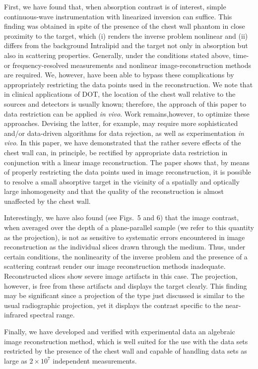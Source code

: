 First, we have found that, when absorption contrast is of interest, simple continuous-wave instrumentation with linearized inversion can suffice. This finding was obtained in spite of the presence of the chest wall phantom in close proximity to the target, which (i) renders the inverse problem nonlinear and (ii) differs from the background Intralipid and the target not only in absorption but also in scattering properties.  Generally, under the conditions stated above,
time- or frequency-resolved measurements and nonlinear image-reconstruction methods are required. We, however, have been able to bypass these complications by appropriately restricting the data points used in the reconstruction. We note that in clinical applications of DOT, the location of the chest wall relative to the sources and detectors is usually known;  therefore, the approach of this paper to data restriction can be applied {\em in vivo}. Work remains,however, to optimize these approaches. Devising the latter, for example, may require more sophisticated and/or data-driven algorithms for data rejection, as well as  experimentation {\em in vivo}. In this paper, we have demonstrated that the rather severe effects of the chest wall can, in principle, be rectified by appropriate data restriction in conjunction with a linear image reconstruction. The paper shows that, by means of properly restricting the data points used in image reconstruction, it is possible to resolve a small absorptive target in the vicinity of a spatially and optically large inhomogeneity
and that the quality of the reconstruction is almost unaffected by the chest wall.

Interestingly, we have also found (see Figs.~5 and 6) that the image contrast, when averaged over the depth of a plane-parallel sample (we refer to
this quantity as the projection), is not as sensitive to systematic errors encountered in image reconstruction as the individual slices drawn through the medium. Thus, under certain conditions, the nonlinearity of the inverse problem and the presence of a scattering contrast render our image reconstruction methods inadequate. Reconstructed slices show severe image artifacts in this case. The projection, however, is free from these artifacts and displays the target clearly. This finding may be significant since a projection of the type just discussed is similar to the usual radiographic projection, yet it displays the contrast specific to the near-infrared spectral range.

Finally, we have developed and verified with experimental data an algebraic image reconstruction method, which is well suited for the use with the data 
sets restricted by the presence of the chest wall and capable of handling data sets as large as $2\times 10^7$ independent measurements.